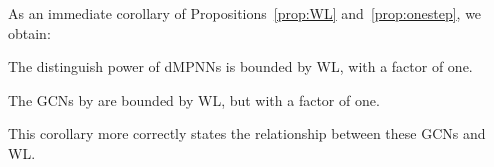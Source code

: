 As an immediate corollary of Propositions~\ref{prop:WL} and~\ref{prop:onestep},  we obtain:
\begin{corollary}
	The distinguish power of dMPNNs is bounded by WL, with a factor of one.
\end{corollary}

%

%
%
%
%
%

\begin{corollary}
	The GCNs by \citet{KipfW16} are bounded by WL, but with a factor of one.
\end{corollary}
This corollary more correctly states the relationship between these GCNs and WL.





